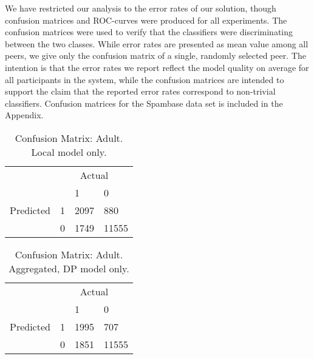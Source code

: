 We have restricted our analysis to the error rates of our solution, though confusion matrices and ROC-curves were produced for all experiments. The confusion matrices were used to verify that the classifiers were discriminating between the two classes. While error rates are presented as mean value among all peers, we give only the confusion matrix of a single, randomly selected peer. The intention is that the error rates we report reflect the model quality on average for all participants in the system, while the confusion matrices are intended to support the claim that the reported error rates correspond to non-trivial classifiers. Confusion matrices for the Spambase data set is included in the Appendix.


\begin{table}[h]
	\centering
	\begin{tabular}{llll}
		& \multicolumn{3}{c}{Actual}                                                      \\
		\multicolumn{1}{c}{} &                        & 1                         & 0                          \\ \cline{3-4} 
		Predicted            & \multicolumn{1}{l|}{1} & \multicolumn{1}{l|}{2097} & \multicolumn{1}{l|}{880}   \\ \cline{3-4} 
		& \multicolumn{1}{l|}{0} & \multicolumn{1}{l|}{1749} & \multicolumn{1}{l|}{11555} \\ \cline{3-4} 
	\end{tabular}
	\caption{Confusion Matrix: Adult. Local model only.}
	\label{fig:confmat_adult_local}
\end{table}

\begin{table}[h]
	\centering
	\begin{tabular}{llll}
		& \multicolumn{3}{c}{Actual}                                                      \\
		\multicolumn{1}{c}{} &                        & 1                         & 0                          \\ \cline{3-4} 
		Predicted            & \multicolumn{1}{l|}{1} & \multicolumn{1}{l|}{1995} & \multicolumn{1}{l|}{707}   \\ \cline{3-4} 
		& \multicolumn{1}{l|}{0} & \multicolumn{1}{l|}{1851} & \multicolumn{1}{l|}{11555} \\ \cline{3-4} 
	\end{tabular}
		\caption{Confusion Matrix: Adult. Aggregated, DP model only.}
		\label{fig:confmat_adult_aggdp}
\end{table}

